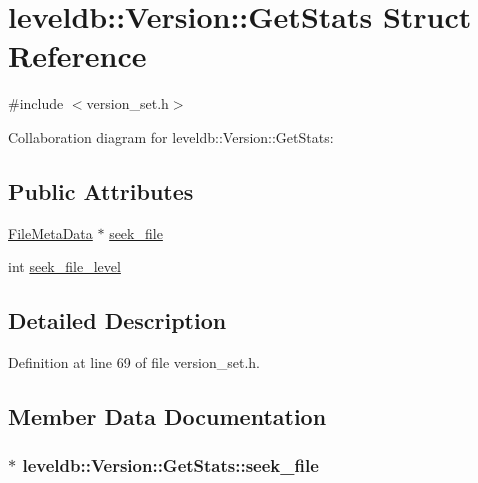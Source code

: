 \hypertarget{structleveldb_1_1_version_1_1_get_stats}{}\section{leveldb\+:\+:Version\+:\+:Get\+Stats Struct Reference}
\label{structleveldb_1_1_version_1_1_get_stats}


{\ttfamily \#include $<$version\+\_\+set.\+h$>$}



Collaboration diagram for leveldb\+:\+:Version\+:\+:Get\+Stats\+:
\subsection*{Public Attributes}
\begin{DoxyCompactItemize}
\item 
\hyperlink{structleveldb_1_1_file_meta_data}{File\+Meta\+Data} $\ast$ \hyperlink{structleveldb_1_1_version_1_1_get_stats_a8c677e9a2d5bc48a5bcc40e07dd2cca7}{seek\+\_\+file}
\item 
int \hyperlink{structleveldb_1_1_version_1_1_get_stats_a6cd952d5850faf00c7d45f79973a76d4}{seek\+\_\+file\+\_\+level}
\end{DoxyCompactItemize}


\subsection{Detailed Description}


Definition at line 69 of file version\+\_\+set.\+h.



\subsection{Member Data Documentation}
\hypertarget{structleveldb_1_1_version_1_1_get_stats_a8c677e9a2d5bc48a5bcc40e07dd2cca7}{}
\subsubsection[{seek\+\_\+file}]{$\ast$ leveldb\+::\+Version\+::\+Get\+Stats\+::seek\+\_\+file}\label{structleveldb_1_1_version_1_1_get_stats_a8c677e9a2d5bc48a5bcc40e07dd2cca7}


